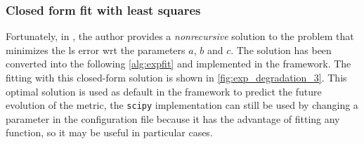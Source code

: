\subsubsection{Closed form fit with least squares}
Fortunately, in \cite{Exp_fit}, the author provides a \emph{nonrecursive} solution to the problem that minimizes the \gls{ls} error \gls{wrt} the parameters $a$, $b$ and $c$. The solution has been converted into the following \autoref{alg:expfit} and implemented in the framework. The fitting with this closed-form solution is shown in \autoref{fig:exp_degradation_3}. This optimal solution is used as default in the framework to predict the future evolution of the metric, the \texttt{scipy} implementation can still be used by changing a parameter in the configuration file because it has the advantage of fitting any function, so it may be useful in particular cases.

